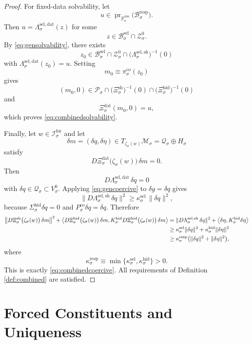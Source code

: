 \documentclass[11pt]{article}
\newcommand{\ForSpace}[1]{\mathcal I_{#1}^{\mathrm{for}}}
\newcommand{\DataSpace}[1]{\mathcal Y_{#1}^{\mathrm{obs}}}
\newcommand{\ProtoSpace}[1]{\mathcal M_{#1}}
\newcommand{\ProtoBody}[1]{\mathcal P_{#1}}
\newcommand{\ResponseData}[1]{\Xi_{#1}^{\mathrm{dat}}}
\newcommand{\ResponseShell}[1]{\Xi_{#1}^{\mathrm{sh}}}
\newcommand{\ResponseHidden}[1]{\Xi_{#1}^{\mathrm{hid}}}
\newcommand{\ResponseImage}[1]{\mathcal B_{#1}^{\mathrm{resp}}}
\newcommand{\GapSpace}[1]{H_{#1}}
\newcommand{\HiddenOperator}[1]{K_{#1}^{\mathrm{hid}}}
\newcommand{\ProtoEmbed}[1]{\zeta_{#1}}
\newcommand{\GenBody}[1]{\mathcal B_{#1}^{\mathrm{sel}}}
\newcommand{\GenData}[1]{\Lambda_{#1}^{\mathrm{sel,dat}}}
\newcommand{\GenShell}[1]{\Lambda_{#1}^{\mathrm{sel,sh}}}
\newcommand{\HiddenSel}[1]{\Sigma_{#1}^{\mathrm{hid}}}
\newcommand{\ZeroHiddenSlice}[1]{\mathcal Z_{#1}^{0}}
\newcommand{\ZeroHiddenVec}[1]{V_{#1}^{0}}
\newcommand{\StateComp}[1]{P_{#1}^{\mathrm{co}}}
\newcommand{\CoreState}[1]{\mathcal Q_{#1}}
\newcommand{\CoreCoord}[1]{\pi_{#1}^{\mathrm{co}}}
\begin{document}
\begin{proof}
For fixed-data solvability, let
\[
u\in\operatorname{pr}_{\DataSpace{\sigma}}\bigl(\ResponseImage{\sigma}\bigr).
\]
Then \(u=\GenData{\sigma}(z)\) for some
\[
z\in\GenBody{\sigma}\cap\ZeroHiddenSlice{\sigma}.
\]
By \eqref{eq:gensolvability}, there exists
\[
z_{0}\in
\GenBody{\sigma}\cap
\ZeroHiddenSlice{\sigma}\cap
\bigl(\GenShell{\sigma}\bigr)^{-1}(0)
\]
with \(\GenData{\sigma}(z_{0})=u\). Setting
\[
m_{0}\equiv\CoreCoord{\sigma}(z_{0})
\]
gives
\[
(m_{0},0)\in
\ProtoBody{\sigma}\cap
\bigl(\ResponseShell{\sigma}\bigr)^{-1}(0)\cap
\bigl(\ResponseHidden{\sigma}\bigr)^{-1}(0)
\]
and
\[
\ResponseData{\sigma}(m_{0},0)=u,
\]
which proves \eqref{eq:combinedsolvability}.

Finally, let \(w\in\ForSpace{\sigma}\) and let
\[
\delta m=(\delta q,\delta\eta)\in T_{\ProtoEmbed{\sigma}(w)}\ProtoSpace{\sigma}
=
\CoreState{\sigma}\oplus\GapSpace{\sigma}
\]
satisfy
\[
D\ResponseData{\sigma}\bigl(\ProtoEmbed{\sigma}(w)\bigr)\,\delta m=0.
\]
Then
\[
D\GenData{\sigma}\,\delta q=0
\]
with \(\delta q\in\CoreState{\sigma}\subset\ZeroHiddenVec{\sigma}\). Applying \eqref{eq:gencoercive} to \(\delta g=\delta q\) gives
\[
\|D\GenShell{\sigma}\,\delta q\|^{2}
\ge
\kappa_{\sigma}^{\mathrm{sel}}\,
\|\delta q\|^{2},
\]
because \(\HiddenSel{\sigma}\delta q=0\) and \(\StateComp{\sigma}\delta q=\delta q\). Therefore
\begin{align*}
\bigl\|
D\ResponseShell{\sigma}\bigl(\ProtoEmbed{\sigma}(w)\bigr)\,\delta m
\bigr\|^{2}
+
\ev{
D\ResponseHidden{\sigma}\bigl(\ProtoEmbed{\sigma}(w)\bigr)\,\delta m,
\HiddenOperator{\sigma}
D\ResponseHidden{\sigma}\bigl(\ProtoEmbed{\sigma}(w)\bigr)\,\delta m
}
&=
\|D\GenShell{\sigma}\,\delta q\|^{2}
+
\ev{\delta\eta,\HiddenOperator{\sigma}\delta\eta}
\\
&\ge
\kappa_{\sigma}^{\mathrm{sel}}\|\delta q\|^{2}
+
\kappa_{\sigma}^{\mathrm{hid}}\|\delta\eta\|^{2}
\\
&\ge
\kappa_{\sigma}^{\mathrm{resp}}
\bigl(
\|\delta q\|^{2}+\|\delta\eta\|^{2}
\bigr),
\end{align*}
where
\[
\kappa_{\sigma}^{\mathrm{resp}}
\equiv
\min\{\kappa_{\sigma}^{\mathrm{sel}},\kappa_{\sigma}^{\mathrm{hid}}\}>0.
\]
This is exactly \eqref{eq:combinedcoercive}. All requirements of Definition \ref{def:combined} are satisfied.
\end{proof}

\section{Forced Constituents and Uniqueness}
\end{document}
